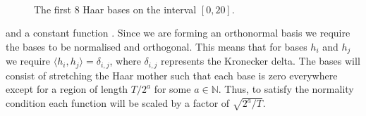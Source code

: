 \documentclass[12pt]{book} %
\begin{document}
  \begin{figure}[ht!]
   \hrulefill
   \begin{center} 
     \quad
      \\ 
      
          \quad
      \\
       
          \quad
       \\
     
        \quad
    \end{center}     
    \caption{The first 8 Haar bases on the interval $[0,20]$.}
    \label{fig:HaarBasis}
    \hrulefill
    \end{figure}


and a constant function \cite{}.  Since we are forming an orthonormal basis we require the bases to be normalised and orthogonal. This means that for bases $h_i$ and $h_j$ we require $\langle h_i, h_j \rangle = \delta_{i,j}$, where $\delta_{i,j}$ represents the Kronecker delta. The bases will consist of stretching the Haar mother such that each base is zero everywhere except for a region of length $T/2^a$ for some $a \in \mathbb{N}$. Thus, to satisfy the normality condition  each function will be scaled by a factor of $\sqrt{2^{a}/ T}$.
\end{document}
